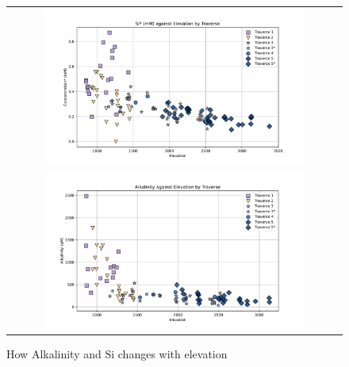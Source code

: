 \begin{figure}[h]
    \centering
    \begin{tabular}{c}
        \includegraphics[width=0.8\textwidth]{Si_mM_EC_Elevation.pdf} \\
        \includegraphics[width=0.8\textwidth]{Alkalinity_Elevation.pdf} \\
    \end{tabular}
    \caption{How Alkalinity and Si changes with elevation}
    \label{fig:spatial_changes_spring2}
\end{figure}

\FloatBarrier





